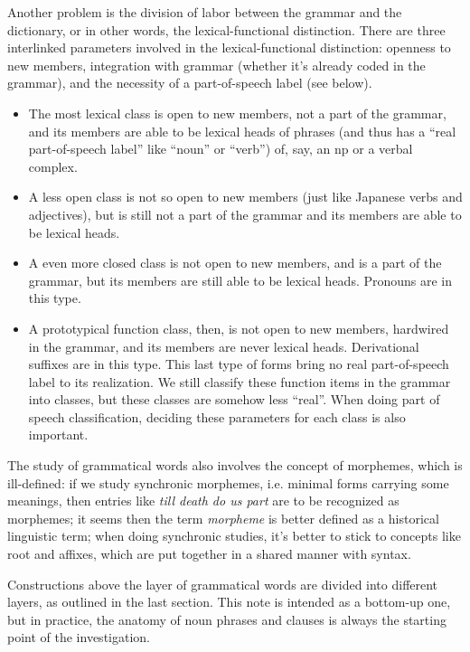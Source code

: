 \documentclass[UTF8, a4paper, oneside, scheme=plain, 12pt]{ctexrep}
\newcommand*{\term}[1]{\emph{#1}}
\newcommand{\form}[1]{\emph{#1}}
\begin{document}
{Another problem is the division of labor 
between the grammar and the dictionary, 
or in other words, the lexical-functional distinction. 
There are three interlinked parameters involved in the lexical-functional distinction:
openness to new members, 
integration with grammar (whether it's already coded in the grammar),
and the necessity of a part-of-speech label (see below).
\begin{itemize}
    \item The most lexical class is open to new members, 
    not a part of the grammar,
    and its members are able to be lexical heads of phrases
    (and thus has a ``real part-of-speech label'' 
    like ``noun'' or ``verb'') 
    of, say, an \acs{np} or a verbal complex.
    \item A less open class is not so open to new members 
    (just like Japanese verbs and adjectives),
    but is still not a part of the grammar 
    and its members are able to be lexical heads. 
    \item A even more closed class is not open to new members,
    and is a part of the grammar,
    but its members are still able to be lexical heads.
    Pronouns are in this type.
    \item A prototypical function class, then, 
    is not open to new members, hardwired in the grammar, 
    and its members are never lexical heads.
    Derivational suffixes are in this type.
    This last type of forms 
    bring no real part-of-speech label to its realization.
    We still classify these function items in the grammar into classes,
    but these classes are somehow less ``real''.
    When doing part of speech classification,
    deciding these parameters for each class 
    is also important.
\end{itemize}

The study of grammatical words 
also involves the concept of morphemes, 
which is ill-defined:
if we study synchronic morphemes, 
i.e. minimal forms carrying some meanings, 
then entries like \form{till death do us part} 
are to be recognized as morphemes; 
it seems then the term \term{morpheme} is better defined 
as a historical linguistic term; 
when doing synchronic studies, 
it's better to stick to concepts like root and affixes, 
which are put together in a shared manner with syntax.

Constructions above the layer of grammatical words
are divided into different layers, as outlined in the last section. 
This note is intended as a bottom-up one, 
but in practice, the anatomy of noun phrases and clauses 
is always the starting point of the investigation. 

}
\end{document}
